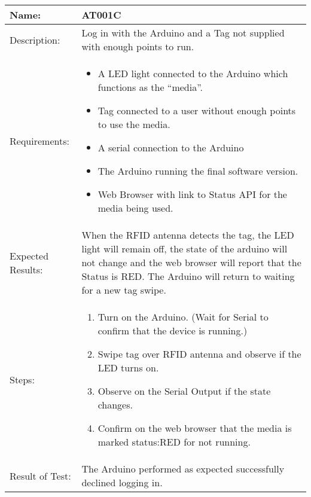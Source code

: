 \begin{table}[h]
	\centering
		\begin{tabular}{|l|p{9cm}|}
		\hline
		\hline
		Name: & AT001C\\
		\hline
		Description: & Log in with the Arduino and a Tag not supplied with enough points to run.\\
		\hline
		Requirements: &
		\begin{itemize}
		  \item A LED light connected to the Arduino which functions as the ``media''.
			\item Tag connected to a user without enough points to use the media.
			\item A serial connection to the Arduino
			\item The Arduino running the final software version.
			\item Web Browser with link to Status API for the media being used.
		\end{itemize}
		\\
		\hline
		Expected Results: & When the RFID antenna detects the tag, the LED light will remain off, the state of the arduino will not change and the web browser will report that the Status is RED.		
		The Arduino will return to waiting for a new tag swipe.\\
		\hline
		Steps: & 
		\begin{enumerate}
			\item Turn on the Arduino. (Wait for Serial to confirm that the device is running.)
			\item Swipe tag over RFID antenna and observe if the LED turns on.
			\item Observe on the Serial Output if the state changes.
			\item Confirm on the web browser that the media is marked status:RED for not running.
		\end{enumerate}
		\\
		\hline
		Result of Test: & The Arduino performed as expected successfully declined logging in.\\
		\hline
		\end{tabular}
\end{table}

